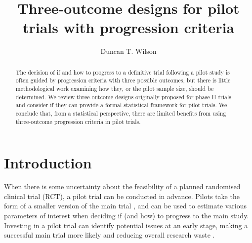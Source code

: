 \documentclass[sagev]{sagej}
\begin{document}

\title{Three-outcome designs for pilot trials with progression criteria}

\author{Duncan T. Wilson}%



\begin{abstract}
The decision of if and how to progress to a definitive trial following a pilot study is often guided by progression criteria with three possible outcomes, but there is little methodological work examining how they, or the pilot sample size, should be determined. We review three-outcome designs originally proposed for phase II trials and consider if they can provide a formal statistical framework for pilot trials. We conclude that, from a statistical perspective, there are limited benefits from using three-outcome progression criteria in pilot trials.
\end{abstract}


\maketitle

\section{Introduction}\label{sec:introduction}

When there is some uncertainty about the feasibility of a planned randomised clinical trial (RCT), a pilot trial can be conducted in advance. Pilots take the form of a smaller version of the main trial \cite{Eldridge2016}, and can be used to estimate various parameters of interest when deciding if (and how) to progress to the main study. Investing in a pilot trial can identify potential issues at an early stage, making a successful main trial more likely and reducing overall research waste \cite{Morgan2018}.
\end{document}
